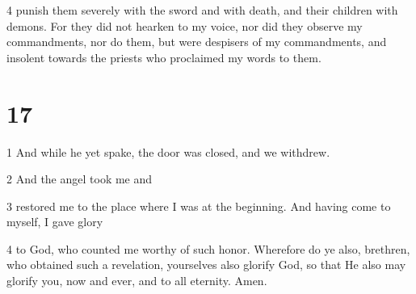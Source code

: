 \par 4 punish them severely with the sword and with death, and their children with demons. For they did not hearken to my voice, nor did they observe my commandments, nor do them, but were despisers of my commandments, and insolent towards the priests who proclaimed my words to them.

\chapter{17}

\par 1 And while he yet spake, the door was closed, and we withdrew.

\par 2 And the angel took me and

\par 3 restored me to the place where I was at the beginning. And having come to myself, I gave glory

\par 4 to God, who counted me worthy of such honor. Wherefore do ye also, brethren, who obtained such a revelation, yourselves also glorify God, so that He also may glorify you, now and ever, and to all eternity. Amen.

